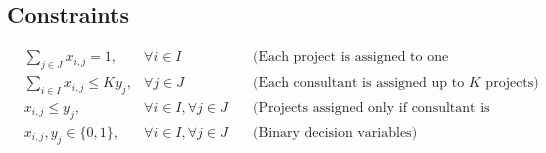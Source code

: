 \documentclass{article}
\begin{document}
\subsection*{Constraints}
\begin{align}
    &\sum_{j \in J} x_{i,j} = 1, &\forall i \in I \quad &\text{(Each project is assigned to one consultant)} \\
    &\sum_{i \in I} x_{i,j} \leq K y_j, &\forall j \in J \quad &\text{(Each consultant is assigned up to $K$ projects)} \\
    &x_{i,j} \leq y_j, &\forall i \in I, \forall j \in J \quad &\text{(Projects assigned only if consultant is hired)} \\
    &x_{i,j}, y_j \in \{0, 1\}, &\forall i \in I, \forall j \in J &\text{(Binary decision variables)}
\end{align}
\end{document}
